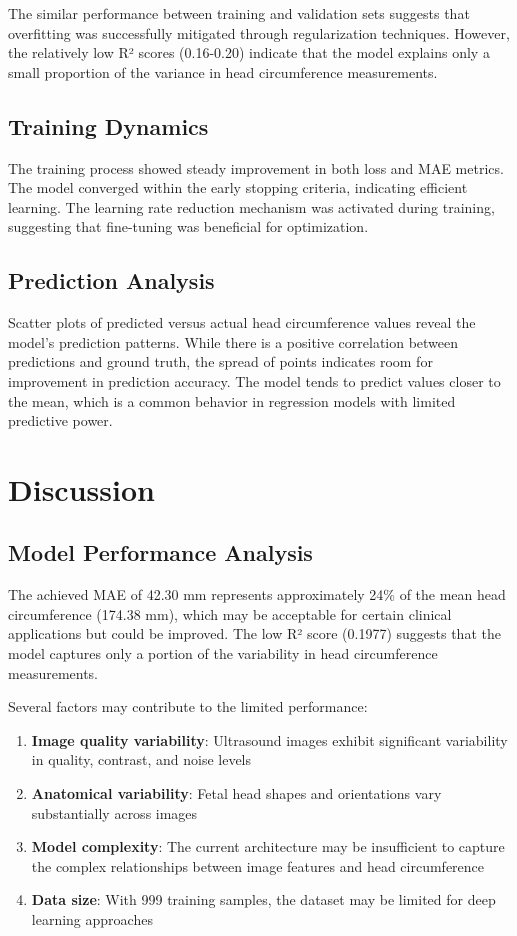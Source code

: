 \documentclass[conference]{IEEEtran}
\begin{document}
The similar performance between training and validation sets suggests that overfitting was successfully mitigated through regularization techniques. However, the relatively low R² scores (0.16-0.20) indicate that the model explains only a small proportion of the variance in head circumference measurements.

\subsection{Training Dynamics}

The training process showed steady improvement in both loss and MAE metrics. The model converged within the early stopping criteria, indicating efficient learning. The learning rate reduction mechanism was activated during training, suggesting that fine-tuning was beneficial for optimization.

\subsection{Prediction Analysis}

Scatter plots of predicted versus actual head circumference values reveal the model's prediction patterns. While there is a positive correlation between predictions and ground truth, the spread of points indicates room for improvement in prediction accuracy. The model tends to predict values closer to the mean, which is a common behavior in regression models with limited predictive power.

\section{Discussion}

\subsection{Model Performance Analysis}

The achieved MAE of 42.30 mm represents approximately 24\% of the mean head circumference (174.38 mm), which may be acceptable for certain clinical applications but could be improved. The low R² score (0.1977) suggests that the model captures only a portion of the variability in head circumference measurements.

Several factors may contribute to the limited performance:
\begin{enumerate}
    \item \textbf{Image quality variability}: Ultrasound images exhibit significant variability in quality, contrast, and noise levels
    \item \textbf{Anatomical variability}: Fetal head shapes and orientations vary substantially across images
    \item \textbf{Model complexity}: The current architecture may be insufficient to capture the complex relationships between image features and head circumference
    \item \textbf{Data size}: With 999 training samples, the dataset may be limited for deep learning approaches
\end{enumerate}
\end{document}

